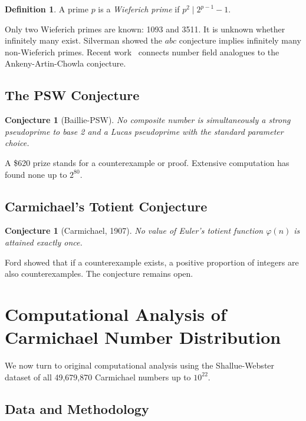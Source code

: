\documentclass{amsart}
\theoremstyle{plain}
\newtheorem{conjecture}[theorem]{Conjecture}
\theoremstyle{definition}
\newtheorem{definition}[theorem]{Definition}
\theoremstyle{remark}
\begin{document}
\begin{definition}
A prime $p$ is a \emph{Wieferich prime} if $p^2 \mid 2^{p-1} - 1$.
\end{definition}

Only two Wieferich primes are known: 1093 and 3511. It is unknown whether infinitely many exist. Silverman showed the $abc$ conjecture implies infinitely many non-Wieferich primes. Recent work~\cite{fellini_murty2025} connects number field analogues to the Ankeny-Artin-Chowla conjecture.

\subsection{The PSW Conjecture}

\begin{conjecture}[Baillie-PSW]
\label{conj:psw}
No composite number is simultaneously a strong pseudoprime to base 2 and a Lucas pseudoprime with the standard parameter choice.
\end{conjecture}

A \$620 prize stands for a counterexample or proof. Extensive computation has found none up to $2^{80}$.

\subsection{Carmichael's Totient Conjecture}

\begin{conjecture}[Carmichael, 1907]
No value of Euler's totient function $\varphi(n)$ is attained exactly once.
\end{conjecture}

Ford showed that if a counterexample exists, a positive proportion of integers are also counterexamples. The conjecture remains open.

\section{Computational Analysis of Carmichael Number Distribution}\label{sec:computational}

We now turn to original computational analysis using the Shallue-Webster dataset of all 49,679,870 Carmichael numbers up to $10^{22}$.

\subsection{Data and Methodology}
\end{document}
